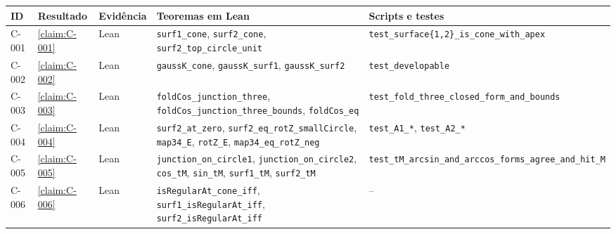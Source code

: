 \setlength{\LTleft}{0pt}\setlength{\LTright}{0pt}
\begin{longtable}{@{}l>{\raggedright}p{}>{\raggedright}p{}>{\raggedright}p{}>{\raggedright\arraybackslash}p{}@{}}
\toprule
\textbf{ID} & \textbf{Resultado} & \textbf{Evidência} & \textbf{Teoremas em Lean} & \textbf{Scripts e testes}\\\midrule\endhead
\bottomrule\endfoot
C-001 & \cref{claim:C-001} & Lean & \texttt{surf1\_\allowbreak{}cone}, \texttt{surf2\_\allowbreak{}cone}, \texttt{surf2\_\allowbreak{}top\_\allowbreak{}circle\_\allowbreak{}unit} & \texttt{test\_\allowbreak{}surface\{1,2\}\_\allowbreak{}is\_\allowbreak{}cone\_\allowbreak{}with\_\allowbreak{}apex}\\
C-002 & \cref{claim:C-002} & Lean & \texttt{gaussK\_\allowbreak{}cone}, \texttt{gaussK\_\allowbreak{}surf1}, \texttt{gaussK\_\allowbreak{}surf2} & \texttt{test\_\allowbreak{}developable}\\
C-003 & \cref{claim:C-003} & Lean & \texttt{foldCos\_\allowbreak{}junction\_\allowbreak{}three}, \texttt{foldCos\_\allowbreak{}junction\_\allowbreak{}three\_\allowbreak{}bounds}, \texttt{foldCos\_\allowbreak{}eq} & \texttt{test\_\allowbreak{}fold\_\allowbreak{}three\_\allowbreak{}closed\_\allowbreak{}form\_\allowbreak{}and\_\allowbreak{}bounds}\\
C-004 & \cref{claim:C-004} & Lean & \texttt{surf2\_\allowbreak{}at\_\allowbreak{}zero}, \texttt{surf2\_\allowbreak{}eq\_\allowbreak{}rotZ\_\allowbreak{}smallCircle}, \texttt{map34\_\allowbreak{}E}, \texttt{rotZ\_\allowbreak{}E}, \texttt{map34\_\allowbreak{}eq\_\allowbreak{}rotZ\_\allowbreak{}neg} & \texttt{test\_\allowbreak{}A1\_\allowbreak{}*}, \texttt{test\_\allowbreak{}A2\_\allowbreak{}*}\\
C-005 & \cref{claim:C-005} & Lean & \texttt{junction\_\allowbreak{}on\_\allowbreak{}circle1}, \texttt{junction\_\allowbreak{}on\_\allowbreak{}circle2}, \texttt{cos\_\allowbreak{}tM}, \texttt{sin\_\allowbreak{}tM}, \texttt{surf1\_\allowbreak{}tM}, \texttt{surf2\_\allowbreak{}tM} & \texttt{test\_\allowbreak{}tM\_\allowbreak{}arcsin\_\allowbreak{}and\_\allowbreak{}arccos\_\allowbreak{}forms\_\allowbreak{}agree\_\allowbreak{}and\_\allowbreak{}hit\_\allowbreak{}M}\\
C-006 & \cref{claim:C-006} & Lean & \texttt{isRegularAt\_\allowbreak{}cone\_\allowbreak{}iff}, \texttt{surf1\_\allowbreak{}isRegularAt\_\allowbreak{}iff}, \texttt{surf2\_\allowbreak{}isRegularAt\_\allowbreak{}iff} & --\\

\end{longtable}
